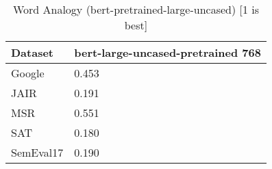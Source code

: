 \begin{table}[]
\centering
\begin{tabular}{l|l}
\hline
Dataset & bert-large-uncased-pretrained 768 \\
\hline
Google & 0.453 \\ 
JAIR & 0.191 \\ 
MSR & 0.551 \\ 
SAT & 0.180 \\ 
SemEval17 & 0.190
\end{tabular}
\caption{Word Analogy (bert-pretrained-large-uncased) [1 is best]}
\label{tab:analogy-bert-pretrained-large-uncased}
\end{table}
